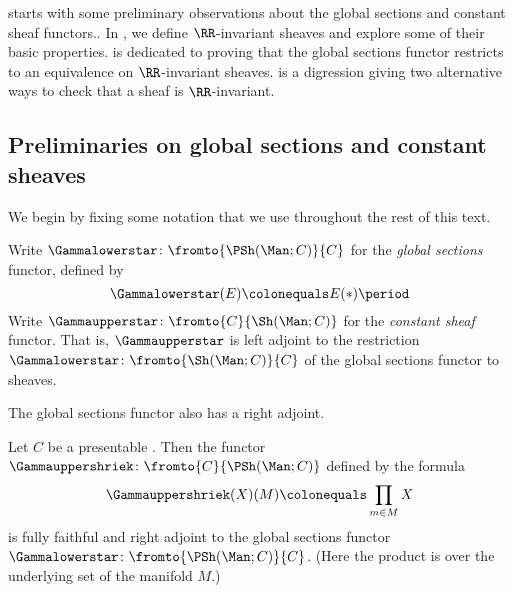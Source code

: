  starts with some preliminary observations about the global sections and constant sheaf functors..
In , we define $ \RR $-invariant sheaves and explore some of their basic properties.
 is dedicated to proving that the global sections functor restricts to an equivalence on $ \RR $-invariant sheaves.
 is a digression giving two alternative ways to check that a sheaf is $ \RR $-invariant.


\subsection{Preliminaries on global sections and constant sheaves}\label{sec:prelimsglobalsec}

We begin by fixing some notation that we use throughout the rest of this text.

\begin{notation}
	Write $ \Gammalowerstar \colon \fromto{\PSh(\Man;C)}{C} $ for the \textit{global sections} functor, defined by
	\begin{equation*}
		\Gammalowerstar(E) \colonequals E(*) \period
	\end{equation*}
	Write $ \Gammaupperstar \colon \fromto{C}{\Sh(\Man;C)} $ for the \textit{constant sheaf} functor.
	That is, $ \Gammaupperstar $ is left adjoint to the restriction $ \Gammalowerstar \colon \fromto{\Sh(\Man;C)}{C} $ of the global sections functor to sheaves.
\end{notation}

\noindent The global sections functor also has a right adjoint.

\begin{lemma}\label{lem:Gammauppershriekpsh}
	Let $ C $ be a presentable \category.
	Then the functor $ \Gammauppershriek \colon \fromto{C}{\PSh(\Man;C)} $ defined by the formula
	\begin{equation*}
		\Gammauppershriek(X)(M) \colonequals \prod_{m \in M} X 
	\end{equation*}
	is fully faithful and right adjoint to the global sections functor $ \Gammalowerstar \colon \fromto{\PSh(\Man;C)}{C} $.
	(Here the product is over the underlying set of the manifold $ M $.)
\end{lemma}


